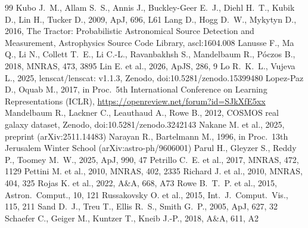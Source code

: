 \documentclass[fleqn,usenatbib]{rasti}
\begin{document}
\begin{thebibliography}{99}
Kubo J.~M., Allam S.~S., Annis J., Buckley-Geer E.~J., Diehl H.~T., Kubik D.,
Lin H., Tucker D., 2009, ApJ, 696, L61
Lang D., Hogg D.~W., Mykytyn D., 2016, The Tractor: Probabilistic
Astronomical Source Detection and Measurement, Astrophysics Source Code
Library, ascl:1604.008
Lanusse F., Ma Q., Li N., Collett T.~E., Li C.-L., Ravanbakhsh S.,
Mandelbaum R., P\'{o}czos B., 2018, MNRAS, 473, 3895
Lin E. et al., 2026, ApJS, 286, 9
Lo R.~K.~L., Vujeva L., 2025, lenscat/lenscat: v1.1.3, Zenodo,
doi:10.5281/zenodo.15399480
Lopez-Paz D., Oquab M., 2017, in Proc.\ 5th International Conference on
Learning Representations (ICLR), \url{https://openreview.net/forum?id=SJkXfE5xx}
Mandelbaum R., Lackner C., Leauthaud A., Rowe B., 2012, COSMOS real galaxy
dataset, Zenodo, doi:10.5281/zenodo.3242143
Nakane M. et al., 2025, preprint (arXiv:2511.14483)
Narayan R., Bartelmann M., 1996, in Proc.\ 13th Jerusalem Winter School
(arXiv:astro-ph/9606001)
Parul H., Gleyzer S., Reddy P., Toomey M.~W., 2025, ApJ, 990, 47
Petrillo C.~E. et al., 2017, MNRAS, 472, 1129
Pettini M. et al., 2010, MNRAS, 402, 2335
Richard J. et al., 2010, MNRAS, 404, 325
Rojas K. et al., 2022, A\&A, 668, A73
Rowe B.~T.~P. et al., 2015, Astron.\ Comput., 10, 121
Russakovsky O. et al., 2015, Int.\ J.\ Comput.\ Vis., 115, 211
Sand D.~J., Treu T., Ellis R.~S., Smith G.~P., 2005, ApJ, 627, 32
Schaefer C., Geiger M., Kuntzer T., Kneib J.-P., 2018, A\&A, 611, A2

\end{thebibliography}
\end{document}
